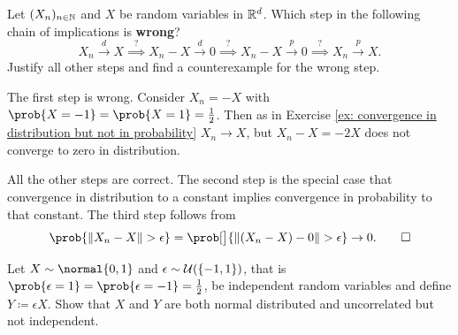\documentclass[11pt]{article}
\begin{document}
\begin{exercise}[subtitle={Find the mistake}]
    Let \((X_n)_{n\in \mathbb{N}}\) and \(X\) be random variables in \(\mathbb{R}^d\).
    Which step in the following chain of implications is \textbf{wrong}?
    \[
        X_n \overset{d}\to X
        \overset{?}\implies X_n - X \overset{d}\to 0
        \overset{?}\implies X_n - X \overset{p}\to 0
        \overset{?}\implies X_n \overset{p}\to X.
    \]
    Justify all other steps and find a counterexample for the wrong step.
\end{exercise}

\begin{solution}
    The first step is wrong. Consider \(X_n = -X\) with
    \(\prob{X=-1}=\prob{X=1}=\frac12\). Then
    as in  Exercise \ref{ex: convergence in distribution but not in
    probability} \(X_n \to X\), but \(X_n - X = -2X\) does not converge to
    zero in distribution.

    All the other steps are correct. The second step is the special case
    that convergence in distribution to a constant implies convergence in
    probability to that constant. The third step follows from 
    \[
        \prob{\norm{X_n - X} > \epsilon}
        =\prob[\big]{\norm{(X_n - X) - 0} > \epsilon}
        \to 0.
        \qedhere
    \]
\end{solution}



\begin{exercise}[subtitle={Uncorrelated but not independent normal}]
    \label{ex: uncorrelated but not independent normal}
    Let \(X \sim \normal{0,1}\) and \(\epsilon \sim \mathcal{U}(\{-1,1\})\), that is \(\prob{\epsilon = 1} = \prob{\epsilon = -1} = \frac{1}{2}\), be independent
    random variables and define
    \(Y \coloneq \epsilon X\).
    Show that \(X\) and \(Y\) are both normal distributed and uncorrelated but not independent.
\end{exercise}
\end{document}
